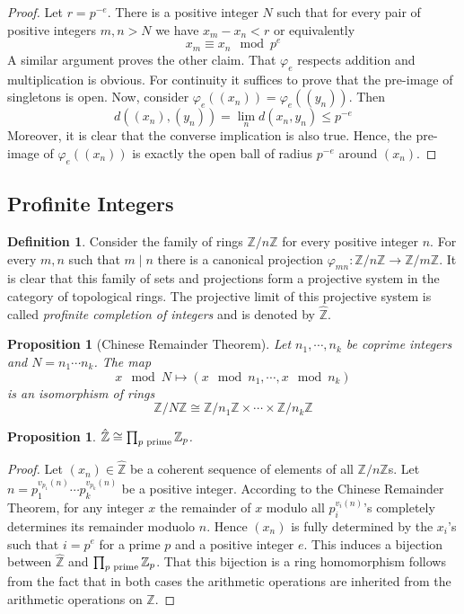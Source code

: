 \documentclass[12pt]{article}
\newtheorem{prop}[thm]{Proposition}
\theoremstyle{definition}
\newtheorem{dfn}[thm]{Definition}
\theoremstyle{remark}
\newcommand{\zee}{\mathbb{Z}}
\newcommand{\zeehat}{\hat{\mathbb{Z}}}
\begin{document}
    \begin{proof}
        Let $r=p^{-e}$. There is a positive integer $N$ such that for every pair of positive integers $m,n> N$ we have $x_m-x_n<r$ or equivalently
        $$x_m\equiv x_n \mod p^e$$
        A similar argument proves the other claim. That $\varphi_e$ respects addition and multiplication is obvious. For continuity it suffices to prove that the pre-image of singletons is open. Now, consider $\varphi_e((x_n))=\varphi_e((y_n))$. Then
        $$d((x_n),(y_n))=\lim_nd(x_n,y_n)\leq p^{-e}$$
        Moreover, it is clear that the converse implication is also true. Hence, the pre-image of $\varphi_e((x_n))$ is exactly the open ball of radius $p^{-e}$ around $(x_n)$.
    \end{proof}

    \subsection{Profinite Integers}

    \begin{dfn}
        Consider the family of rings $\zee/n\zee$ for every positive integer $n$. For every $m,n$ such that $m\mid n$ there is a canonical projection $\varphi_{mn}\colon\zee/n\zee\to\zee/m\zee$. It is clear that this family of sets and projections form a projective system in the category of topological rings. The projective limit of this projective system is called \emph{profinite completion of integers} and is denoted by $\zeehat$.
    \end{dfn}

    \begin{prop}[Chinese Remainder Theorem]
        Let $n_1,\cdots,n_k$ be coprime integers and $N=n_1\cdots n_k$. The map
        $$x \mod N \mapsto (x \mod n_1,\cdots,x \mod n_k)$$
        is an isomorphism of rings
        $$\mathbb{Z}/N\mathbb{Z}\cong \mathbb{Z}/n_1\mathbb{Z}\times\cdots\times\mathbb{Z}/n_k\mathbb{Z}$$
    \end{prop}

    \begin{prop}
        $\zeehat\cong\prod_{p\textup{ prime}}\zee_p$.
    \end{prop}

    \begin{proof}
        Let $(x_n)\in\zeehat$ be a coherent sequence of elements of all $\zee/n\zee$s. Let $n=p_1^{v_{p_1}(n)}\cdots p_k^{v_{p_k}(n)}$ be a positive integer. According to the Chinese Remainder Theorem, for any integer $x$ the remainder of $x$ modulo all $p_i^{{v_i}(n)}$'s completely determines its remainder moduolo $n$. Hence $(x_n)$ is fully determined by the $x_i$'s such that $i=p^e$ for a prime $p$ and a positive integer $e$. This induces a bijection between $\zeehat$ and $\prod_{p\textup{ prime}}\zee_p$. That this bijection is a ring homomorphism follows from the fact that in both cases the arithmetic operations are inherited from the arithmetic operations on $\zee$.
    \end{proof}
\end{document}
